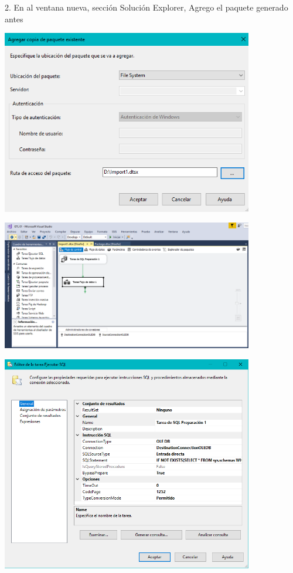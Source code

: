 2. En al ventana nueva, sección Solución Explorer, Agrego el paquete generado antes\\
	\begin{center}
	\includegraphics[width=11cm]{./Imagenes/img14}
	\end{center}	
	\begin{center}
	\includegraphics[width=11cm]{./Imagenes/img15}
	\end{center}	
	\begin{center}
	\includegraphics[width=11cm]{./Imagenes/img16}
	\end{center}	

